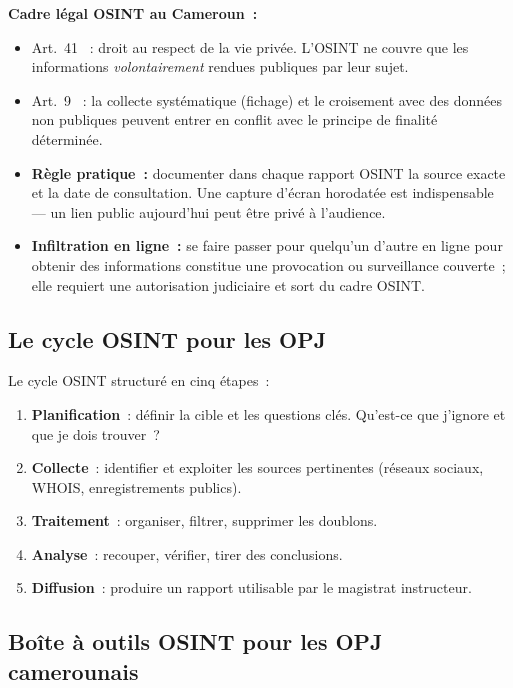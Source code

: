 \begin{boxjuris}
\textbf{Cadre légal OSINT au Cameroun~:}
\begin{itemize}
    \item Art.~41 ~: droit au respect de la vie privée.
          L'OSINT ne couvre que les informations \emph{volontairement}
          rendues publiques par leur sujet.
    \item Art.~9 ~: la collecte systématique (fichage)
          et le croisement avec des données non publiques peuvent
          entrer en conflit avec le principe de finalité déterminée.
    \item \textbf{Règle pratique~:} documenter dans chaque rapport OSINT
          la source exacte et la date de consultation. Une capture d'écran
          horodatée est indispensable --- un lien public aujourd'hui peut
          être privé à l'audience.
    \item \textbf{Infiltration en ligne~:} se faire passer pour quelqu'un
          d'autre en ligne pour obtenir des informations constitue une
          provocation ou surveillance couverte~; elle requiert une
          autorisation judiciaire et sort du cadre OSINT.
\end{itemize}
\end{boxjuris}

\subsection{Le cycle OSINT pour les OPJ}

Le cycle OSINT structuré en cinq étapes~:
\begin{enumerate}
    \item \textbf{Planification}~: définir la cible et les questions
          clés. Qu'est-ce que j'ignore et que je dois trouver~?
    \item \textbf{Collecte}~: identifier et exploiter les sources
          pertinentes (réseaux sociaux, WHOIS, enregistrements publics).
    \item \textbf{Traitement}~: organiser, filtrer, supprimer les doublons.
    \item \textbf{Analyse}~: recouper, vérifier, tirer des conclusions.
    \item \textbf{Diffusion}~: produire un rapport utilisable par le
          magistrat instructeur.
\end{enumerate}

\subsection{Boîte à outils OSINT pour les OPJ camerounais}

